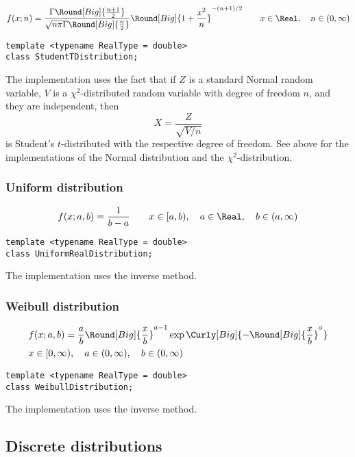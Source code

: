 \begin{equation*}
  f(x;n) =
  \frac{\Gamma\Round[Big]{\frac{n + 1}{2}}}
  {\sqrt{n\pi}\Gamma\Round[Big]{\frac{n}{2}}}
  \Round[Big]{1 + \frac{x^2}{n}}^{-(n + 1)/2} \qquad
  x \in \Real,\quad n \in (0, \infty)
\end{equation*}
\begin{Verbatim}
template <typename RealType = double>
class StudentTDistribution;
\end{Verbatim}
The implementation uses the fact that if $Z$ is a standard Normal random
variable, $V$ is a $\chi^2$-distributed random variable with degree of freedom
$n$, and they are independent, then
\begin{equation*}
  X = \frac{Z}{\sqrt{V / n}}
\end{equation*}
is Student's $t$-distributed with the respective degree of freedom. See above
for the implementations of the Normal distribution and the
$\chi^2$-distribution.

\subsubsection{Uniform distribution}

\begin{equation*}
  f(x;a,b) = \frac{1}{b - a} \qquad
  x \in [a, b),\quad a \in \Real,\quad b \in (a, \infty)
\end{equation*}
\begin{Verbatim}
template <typename RealType = double>
class UniformRealDistribution;
\end{Verbatim}
The implementation uses the inverse method.

\subsubsection{Weibull distribution}

\begin{align*}
  &f(x;a,b) = \frac{a}{b}\Round[Big]{\frac{x}{b}}^{a - 1}
  \exp\Curly[Big]{-\Round[Big]{\frac{x}{b}}^a} \\
  &x \in [0, \infty),\quad a \in (0, \infty),\quad b \in (0, \infty)
\end{align*}
\begin{Verbatim}
template <typename RealType = double>
class WeibullDistribution;
\end{Verbatim}
The implementation uses the inverse method.

\subsection{Discrete distributions}
\label{sub:Discrete distributions}

